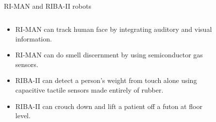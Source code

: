 \documentclass[compress]{beamer}
\begin{document}
\subsection{}
{
\begin{frame}{RI-MAN and RIBA-II robots}

  \begin{columns}


      \begin{column}{0.6\linewidth}
      \centering

          \begin{itemize}
              \item RI-MAN can track human face by integrating auditory and
              visual information.
              \item RI-MAN can do smell discernment by using semiconductor gas sensors.
              \item RIBA-II can detect a person’s weight from touch alone using
                    capacitive tactile sensors made entirely of rubber.
              \item RIBA-II can crouch down and lift a patient off a futon at floor level.
          \end{itemize}

      \end{column}


      \begin{column}{0.6\linewidth}

          \begin{figure}
              \centering
          \end{figure}

        \end{column}

     \end{columns}


\end{frame}
}
\end{document}
